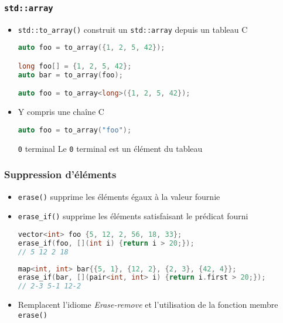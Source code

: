 \documentclass[C++.tex]{subfiles}
\begin{document}
\begin{frame}[fragile]
	\frametitle{\lstinline|std::array|}
	\begin{itemize}
		\item \lstinline|std::to_array()| construit un \lstinline|std::array| depuis un tableau C

		\begin{lstlisting}[language=C++]
auto foo = to_array({1, 2, 5, 42});

long foo[] = {1, 2, 5, 42};
auto bar = to_array(foo);

auto foo = to_array<long>({1, 2, 5, 42});\end{lstlisting}

		\item Y compris une chaîne C

		\begin{lstlisting}[language=C++]
auto foo = to_array("foo");\end{lstlisting}

		\begin{alertblock}{\lstinline|0| terminal}
			Le \lstinline|0| terminal est un élément du tableau
		\end{alertblock}
	\end{itemize}
\end{frame}

\begin{frame}[fragile]
	\frametitle{Suppression d'éléments}
	\begin{itemize}
		\item \lstinline|erase()| supprime les éléments égaux à la valeur fournie
		\item \lstinline|erase_if()| supprime les éléments satisfaisant le prédicat fourni

		\begin{lstlisting}[language=C++]
vector<int> foo {5, 12, 2, 56, 18, 33};
erase_if(foo, [](int i) {return i > 20;});
// 5 12 2 18\end{lstlisting}

		\begin{lstlisting}[language=C++]
map<int, int> bar{{5, 1}, {12, 2}, {2, 3}, {42, 4}};
erase_if(bar, [](pair<int, int> i) {return i.first > 20;});
// 2-3 5-1 12-2 \end{lstlisting}

		\item Remplacent l'idiome \og \textit{Erase-remove}\fg{} et l'utilisation de la fonction membre \lstinline|erase()|
	\end{itemize}
\end{frame}
\end{document}
